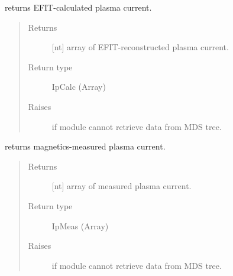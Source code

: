 \documentclass[letterpaper,10pt,english]{sphinxmanual}
\begin{document}
\begin{fulllineitems}
\begin{fulllineitems}
\begin{quote}
\begin{description}
\end{description}\end{quote}

\end{fulllineitems}


\begin{fulllineitems}
\label{\detokenize{eqtools:eqtools.EFIT.EFITTree.getIpCalc}}
returns EFIT-calculated plasma current.
\begin{quote}\begin{description}
\item[{Returns}] \leavevmode
{[}nt{]} array of EFIT-reconstructed plasma current.

\item[{Return type}] \leavevmode
IpCalc (Array)

\item[{Raises}] \leavevmode
{} \textendash{} if module cannot retrieve data from MDS tree.

\end{description}\end{quote}

\end{fulllineitems}


\begin{fulllineitems}
\label{\detokenize{eqtools:eqtools.EFIT.EFITTree.getIpMeas}}
returns magnetics-measured plasma current.
\begin{quote}\begin{description}
\item[{Returns}] \leavevmode
{[}nt{]} array of measured plasma current.

\item[{Return type}] \leavevmode
IpMeas (Array)

\item[{Raises}] \leavevmode
{} \textendash{} if module cannot retrieve data from MDS tree.

\end{description}\end{quote}


\end{fulllineitems}
\end{fulllineitems}
\end{document}
